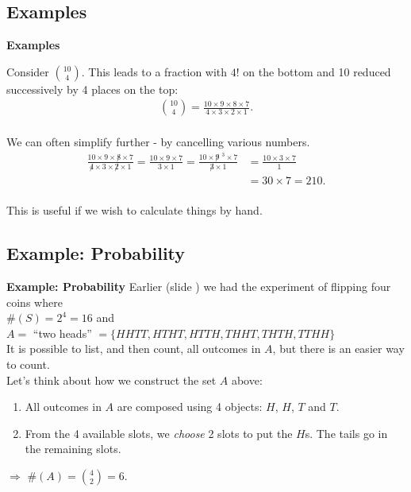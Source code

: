 \documentclass[compress]{beamer}        %
\makeatletter
\newcommand{\tcb}{\textcolor{beamer@blendedblue}}
\makeatother
\begin{document}
\subsection{Examples}
\begin{frame}{\bf \tcb{Examples}}

Consider $\binom{10}{4}$. This leads to a fraction with $4!$ on the bottom and 10 reduced successively by 4 places on the top:\\[-0.3cm]
\begin{align*}
\binom{10}{4} = \frac{10\times9\times8\times7}{4\times3\times2\times1}.\\
\end{align*}

We can often simplify further - by cancelling various numbers.\\[-0.3cm]
\begin{align*}
\frac{10\times9\times\not8\times7}{\not4\times3\times\not2\times1} = \frac{10\times9\times7}{3\times1}
= \frac{10\times\not9\,\,^3\times7}{\not3\times1} &= \frac{10\times3\times7}{1} \\ &= 30 \times 7 = 210.\\
\end{align*}

This is useful if we wish to calculate things by hand.

\end{frame}




\subsection{Example: Probability}
\begin{frame}{\bf \tcb{Example: Probability}}
Earlier (slide \pageref{probslide}) we had the experiment of flipping four coins where\\[0.2cm]
$\#(S) = 2^4 = 16$ and\\[0.2cm]
$A =$ ``two heads'' $= \{HHTT, HTHT, HTTH, THHT, THTH, TTHH\}$\\[0.4cm]

It is possible to list, and then count, all outcomes in $A$, but there is an easier way to count.\\[0.3cm]

Let's think about how we construct the set $A$ above:\\[0.1cm]
\begin{enumerate}[1.]\itemsep0.2cm
\item All outcomes in $A$ are composed using 4 objects: $H$, $H$, $T$ and $T$.
\item From the 4 available slots, we \emph{choose} 2 slots to put the $H$s. The tails go in the remaining slots.\\[0.5cm]
\end{enumerate}


$\Rightarrow$ $\# (A) = \binom{4}{2} =  6$.

\end{frame}
\end{document}
